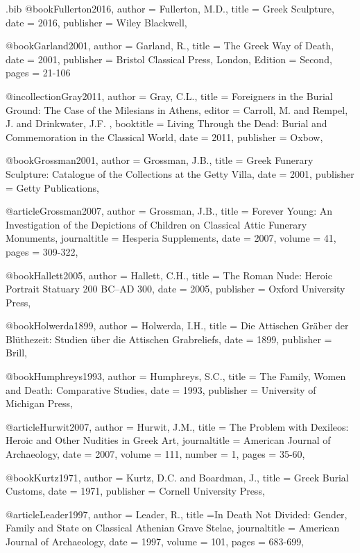\begin{filecontents}{\IJSRAidentifier.bib}
	@book{Fullerton2016,
		author = {Fullerton, M.D.},
		title = {Greek Sculpture},
		date = {2016},
		publisher = {Wiley Blackwell},
	}

		@book{Garland2001,
		author = {Garland, R.},
		title = {The Greek Way of Death},
		date = {2001},
		publisher = {Bristol Classical Press, London},
		Edition = {Second},
		pages = {21-106}
	}

	@incollection{Gray2011,
		author = {Gray, C.L.},
		title = {Foreigners in the Burial Ground: The Case of the Milesians in Athens},
		editor = {Carroll, M. and  Rempel, J. and Drinkwater, J.F. },
		booktitle = {Living Through the Dead: Burial and Commemoration in the Classical World},
		date = {2011},
		publisher = {Oxbow},
	}

	@book{Grossman2001,
		author = {Grossman, J.B.},
		title = {Greek Funerary Sculpture: Catalogue of the Collections at the Getty Villa},
		date = {2001},
		publisher = {Getty Publications},
	}

	@article{Grossman2007,
		author = {Grossman, J.B.},
		title = {Forever Young: An Investigation of the Depictions of Children on Classical Attic Funerary Monuments},
		journaltitle = {Hesperia Supplements},
		date = {2007},
		volume = {41},
		pages = {309-322},
	}

	@book{Hallett2005,
		author = {Hallett, C.H.},
		title = {The Roman Nude: Heroic Portrait Statuary 200 BC--AD 300},
		date = {2005},
		publisher = {Oxford University Press},
	}

	@book{Holwerda1899,
		author = {Holwerda, I.H.},
		title = {Die Attischen Gräber der Blüthezeit: Studien über die Attischen Grabreliefs},
		date = {1899},
		publisher = {Brill},
	}

	@book{Humphreys1993,
		author = {Humphreys, S.C.},
		title = {The Family, Women and Death: Comparative Studies},
		date = {1993},
		publisher = {University of Michigan Press},
	}

	@article{Hurwit2007,
		author = {Hurwit, J.M.},
		title = {The Problem with Dexileos: Heroic and Other Nudities in Greek Art},
		journaltitle = {American Journal of Archaeology},
		date = {2007},
		volume = {111},
		number = {1},
		pages = {35-60},
	}

	@book{Kurtz1971,
		author = {Kurtz, D.C. and Boardman, J.},
		title = {Greek Burial Customs},
		date = {1971},
		publisher = {Cornell University Press},
	}

	@article{Leader1997,
		author = {Leader, R.},
		title ={In Death Not Divided: Gender, Family and State on Classical Athenian Grave Stelae},
		journaltitle = {American Journal of Archaeology},
		date = {1997},
		volume = {101},
		pages = {683-699},
	}


\end{filecontents}

